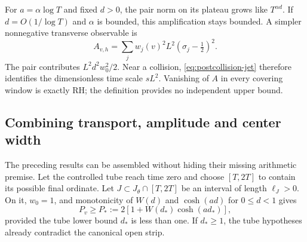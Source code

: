 For \(a=\alpha\log T\) and fixed \(d>0\), the pair norm on its
plateau grows like \(T^{\alpha d}\). If \(d=O(1/\log T)\) and
\(\alpha\) is bounded, this amplification stays bounded. A simpler
nonnegative transverse observable is
\begin{equation}\label{eq:local-transverse}
 A_{v,h}=\sum_jw_j(v)^2 L^2(\sigma_j-\tfrac12)^2.
\end{equation}
The pair contributes \(L^2d^2w_0^2/2\). Near a collision,
\eqref{eq:postcollision-jet} therefore identifies the dimensionless
time scale \(sL^2\). Vanishing of \(A\) in every covering window
is exactly RH; the definition provides no independent upper bound.

\subsection{Combining transport, amplitude and center width}
The preceding results can be assembled without hiding their missing
arithmetic premise. Let the controlled tube reach time zero and choose
\([T,2T]\) to contain its possible final ordinate. Let
\(J\subset J_\theta\cap[T,2T]\) be an interval of length \(\ell_J>0\).
On it, \(w_0=1\), and monotonicity of \(W(d)\) and \(\cosh(ad)\)
for \(0\le d<1\) gives
\begin{equation}\label{eq:P-star}
 P_v\ge P_*:=2[1+W(d_*)\cosh(ad_*)],
\end{equation}
provided the tube lower bound \(d_*\) is less than one. If
\(d_*\ge1\), the tube hypotheses already contradict the canonical
open strip.

